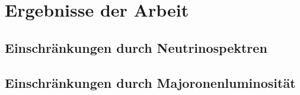 \chapter{Ergebnisse der Arbeit}

\section{Einschränkungen durch Neutrinospektren}

\section{Einschränkungen durch Majoronenluminosität}
